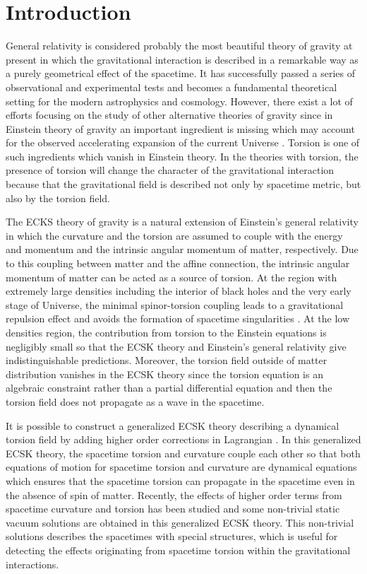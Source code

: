 \documentclass[aps,showpacs,preprintnumbers,amsmath,amssymb]{revtex4}
\begin{document}
\section{Introduction}

 General relativity is considered probably the most beautiful theory of gravity at present
 in which the gravitational interaction is described in a remarkable way as
 a purely geometrical effect of the spacetime. It has successfully passed a series of observational and experimental tests \cite{t3} and becomes a fundamental theoretical setting for the modern astrophysics and cosmology.
However, there exist a lot of efforts focusing on the study of other alternative theories of gravity since in Einstein theory of gravity an important ingredient is missing which may account for the observed accelerating expansion of the current Universe \cite{t5,t501,t51,t6,t61}.
Torsion is one of such ingredients which vanish in Einstein theory. In the theories with torsion, the presence of torsion will change the character of the gravitational interaction because that the gravitational field is described not only by spacetime metric,
but also by the torsion field.

The ECKS theory of gravity \cite{Cartan,Kibble} is a natural extension of Einstein's general relativity
in which  the curvature and the torsion are assumed to
couple with the energy and momentum and the intrinsic angular momentum of matter, respectively. Due to this coupling between matter and the affine connection, the
intrinsic angular momentum of matter can be acted as a source of torsion.
At the region with extremely large densities including the interior of black holes and the very early stage of Universe, the minimal spinor-torsion coupling leads to a gravitational repulsion effect and avoids the formation
of spacetime singularities \cite{avoid,avoid1,avoid2,avoid3}. At the low densities region, the contribution from torsion to the Einstein equations is negligibly small so that the ECSK theory and Einstein's general relativity give indistinguishable predictions. Moreover, the torsion field outside of matter distribution vanishes in the ECSK theory since the torsion equation is an algebraic constraint rather than a partial differential equation and then the torsion field does not propagate as a wave in the spacetime.

It is possible to construct a generalized ECSK theory describing a dynamical torsion
field by adding higher order corrections in Lagrangian \cite{gK1,gK2}. In this generalized ECSK theory,
the spacetime torsion and curvature couple each other so that both equations of motion for
spacetime torsion and curvature are dynamical equations which ensures that the spacetime torsion can propagate in the spacetime even in the absence of spin of matter. Recently, the effects of higher order terms from spacetime curvature and torsion has been studied and some non-trivial static vacuum solutions \cite{sbh1} are obtained in this generalized ECSK theory. This non-trivial solutions describes the spacetimes with special structures, which is useful for
detecting the effects originating from spacetime torsion within the gravitational interactions.
\end{document}
